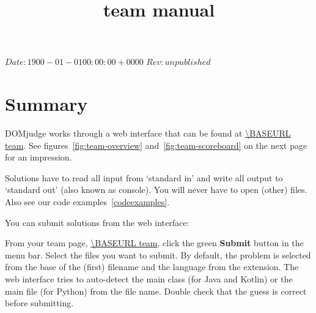 

\usepackage[english]{babel}

\SVN $Date: 1900-01-01 00:00:00 +0000 $
\SVN $Rev: unpublished $

\title{\DOMjudge team manual}




\titlestuff{\DOMJUDGEVERSION}{\SVNRev}{\SVNDate}{\today}

\section*{Summary}

DOMjudge works through a web interface that can be found at
\url{\BASEURL team}. See figures~\ref{fig:team-overview}
and~\ref{fig:team-scoreboard} on the next page for an impression.

Solutions have to read all input from `standard in' and write all
output to `standard out' (also known as console). You will never have
to open (other) files. Also see our code examples~\ref{codeexamples}.

You can submit solutions%
from the web interface:
\begin{description}[\breaklabel\setlabelstyle{\bfseries}]
\item[Web interface]
From your team page, \url{\BASEURL team}, click the green \textbf{Submit}
button in the menu bar. Select the files you want to submit.
By default, the problem is selected from the base of the (first)
filename and the language from the extension. The web interface tries
to auto-detect the main class (for Java and Kotlin) or the main file (for
Python) from the file name. Double check that the guess is
correct before submitting.
\end{description}

